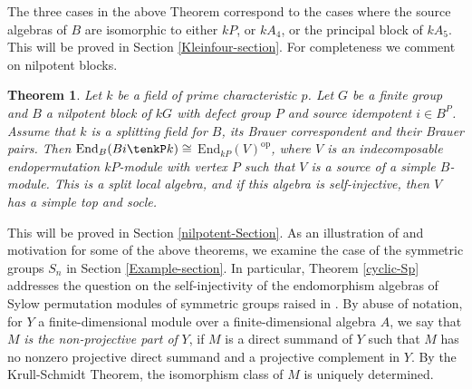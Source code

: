 \documentclass{amsart}
\theoremstyle{plain}\newtheorem{Theorem}{Theorem}[section]
\theoremstyle{plain}\newtheorem{Conjecture}[Theorem]{Conjecture}
\theoremstyle{plain}\newtheorem{Corollary}[Theorem]{Corollary}
\theoremstyle{plain}\newtheorem{Lemma}[Theorem]{Lemma}
\theoremstyle{plain}\newtheorem{Proposition}[Theorem]{Proposition}
\theoremstyle{definition}\newtheorem{Definition}[Theorem]{Definition}
\theoremstyle{definition}\newtheorem{Example}[Theorem]{Example}
\theoremstyle{definition}\newtheorem{Examples}[Theorem]{Examples}
\theoremstyle{definition}\newtheorem{Exercise}[Theorem]{Exercise}
\theoremstyle{definition}\newtheorem{Notation}[Theorem]{Notation}
\theoremstyle{definition}\newtheorem{Remark}[Theorem]{Remark}
\theoremstyle{definition}\newtheorem{Remarks}[Theorem]{Remarks}
\theoremstyle{plain}\newtheorem{Statement}[Theorem]{}
\def\End{\mathrm{End}}
\def\op{\mathrm{op}}
\begin{document}
The three cases in the above Theorem correspond to the cases where the source
algebras of $B$ are isomorphic to either $kP$, or $kA_4$, or the principal block
of $kA_5$. This will be proved in Section \ref{Kleinfour-section}. For completeness
we comment on nilpotent blocks.

\begin{Theorem} \label{nilpotent-thm}
Let $k$ be a field of prime characteristic $p$.
Let $G$ be a finite group and $B$ a nilpotent block of $kG$ with defect group $P$
and source idempotent $i\in B^P$.  Assume that $k$ is a splitting field for
$B$, its Brauer correspondent and their Brauer pairs.
Then $\End_{B}(Bi\tenkP k)\cong$ $\End_{kP}(V)^\op$, where $V$ is an 
indecomposable endopermutation $kP$-module with vertex $P$ such that
$V$ is a source of a simple $B$-module. This is a split local algebra, and if this
algebra is self-injective, then $V$ has a simple top and socle.
\end{Theorem}

This will be proved in Section \ref{nilpotent-Section}.
As  an illustration of  and motivation for  some of the   above theorems, we  
examine the  case of the  symmetric groups  $S_n$  in Section \ref{Example-section}.   
In  particular,  Theorem \ref {cyclic-Sp}  addresses the 
question  on the self-injectivity of  the endomorphism algebras 
of  Sylow permutation modules of symmetric groups raised in  
\cite[Section 6]{DGGLNSS}.
By abuse of notation, for  $Y$ a finite-dimensional module over a finite-dimensional 
algebra $A$, we  say that $M$ {\em is the non-projective part of}  $Y$, if 
$M$ is a direct summand of $Y$ such that $M$ has no nonzero projective direct 
summand and a  projective complement in $Y$. By the Krull-Schmidt Theorem, 
the isomorphism  class of $M$ is uniquely determined.   
\end{document}
